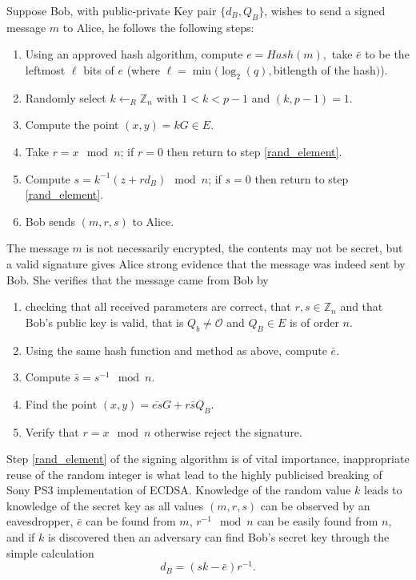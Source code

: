 \documentclass{llncs}
\newcommand{\Z}{{\mathbb Z}}
\begin{document}
Suppose Bob, with public-private Key pair $\{d_B,Q_B\}$, wishes to send a signed message $m$ to Alice, he follows the following steps:
\begin{enumerate}
\item Using an approved hash algorithm, compute $e=Hash(m),$ take $\bar{e}$ to be the leftmost $\ell$ bits of $e$ (where $\ell=\min(\log_2(q),$bitlength of the hash$)$). 
\item\label{rand_element} Randomly select $k\leftarrow_R\Z_n$ with $1<k<p-1$ and $(k,p-1)=1$.
\item\label{scalar_mult} Compute the point $(x,y)=kG\in E$. 
\item Take $r=x\mod n$; if $r=0$ then return to step \ref{rand_element}.
\item Compute $s=k^{-1}(z+rd_B)\mod n$; if $s=0$ then return to step \ref{rand_element}.
\item Bob sends $(m,r,s)$ to Alice.
\end{enumerate}
The message $m$ is not necessarily encrypted, the contents may not be secret, but a valid signature gives Alice strong evidence that the message was indeed sent by Bob. She verifies that the message came from Bob by 

\begin{enumerate}
\item checking that all received parameters are correct, that $r,s\in\Z_n$ and that Bob's public key is valid, that is $Q_b\neq \mathcal{O}$ and $Q_B\in E$ is of order $n$.
\item Using the same hash function and method as above, compute $\bar{e}$.
\item Compute $\bar{s}=s^{-1}\mod n$.
\item Find the point $(x,y)=\bar{es}G+r\bar{s}Q_B$.
\item Verify that $r=x\mod n$ otherwise reject the signature.
\end{enumerate}

Step \ref{rand_element} of the signing algorithm is of vital importance, inappropriate reuse of the random integer is what lead to the highly publicised breaking of Sony PS3 implementation of ECDSA. Knowledge of the random value $k$ leads to knowledge of the secret key as all values $(m,r,s)$ can be observed by an eavesdropper, $\bar{e}$ can be found from $m$, $r^{-1}\mod n$ can be easily found from $n$, and if $k$ is discovered then an adversary can find Bob's secret key through the simple calculation $$d_B=(sk-\bar{e})r^{-1}.$$
\end{document}
